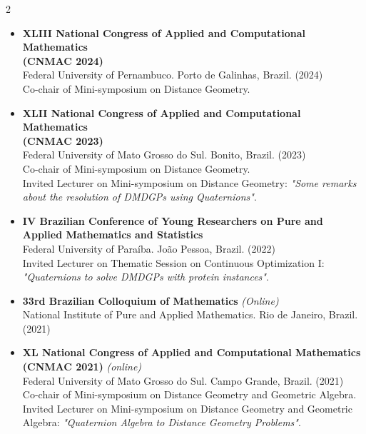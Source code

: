 \documentclass[10pt,A4,english]{article}
\begin{document}
\begin{paracol}{2}
\begin{rightcolumn}
\begin{itemize}[leftmargin=*]
\bigskip 

\item \textbf{XLIII National Congress of Applied and Computational Mathematics \\ (CNMAC 2024)}
\medskip \\ 
Federal University of Pernambuco. Porto de Galinhas, Brazil. (2024)
\medskip \\ 
Co-chair of Mini-symposium on Distance Geometry.

\bigskip 

\item \textbf{XLII National Congress of Applied and Computational Mathematics \\ (CNMAC 2023)}
\medskip \\ 
Federal University of Mato Grosso do Sul. Bonito, Brazil. (2023)
\medskip \\ 
Co-chair of Mini-symposium on Distance Geometry.
\medskip \\
Invited Lecturer on Mini-symposium on Distance Geometry: \textit{"Some remarks about the resolution of DMDGPs using Quaternions"}.

\bigskip 

\item \textbf{IV Brazilian Conference of Young Researchers on Pure and Applied Mathematics and Statistics}
\medskip \\
Federal University of Paraíba. João Pessoa, Brazil. (2022)
\medskip \\
Invited Lecturer on Thematic Session on Continuous Optimization I: \textit{"Quaternions to solve DMDGPs with protein instances"}.

\bigskip

\item \textbf{33rd Brazilian Colloquium of Mathematics} \textit{(Online)}
\medskip \\
National Institute of Pure and Applied Mathematics. Rio de Janeiro, Brazil. (2021)

\bigskip

\item \textbf{XL National Congress of Applied and Computational Mathematics \\ (CNMAC 2021)} \textit{(online)}
\medskip \\ 
Federal University of Mato Grosso do Sul. Campo Grande, Brazil. (2021)
\medskip \\ 
Co-chair of Mini-symposium on Distance Geometry and Geometric Algebra.
\medskip \\
Invited Lecturer on Mini-symposium on Distance Geometry and Geometric Algebra: \textit{"Quaternion Algebra to Distance Geometry Problems"}.


\end{itemize}
\end{rightcolumn}
\end{paracol}
\end{document}
